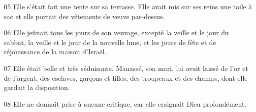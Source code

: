 
05 Elle s'était fait une tente sur sa terrasse. Elle avait mis sur ses reins une toile à sac et elle portait des vêtements de veuve par-dessus.

06 Elle jeûnait tous les jours de son veuvage, excepté la veille et le jour du sabbat, la veille et le jour de la nouvelle lune, et les jours de fête et de réjouissance de la maison d'Israël.

07 Elle était belle et très séduisante. Manassé, son mari, lui avait laissé de l'or et de l'argent, des esclaves, garçons et filles, des troupeaux et des champs, dont elle gardait la disposition.

08 Elle ne donnait prise à aucune critique, car elle craignait Dieu profondément.
